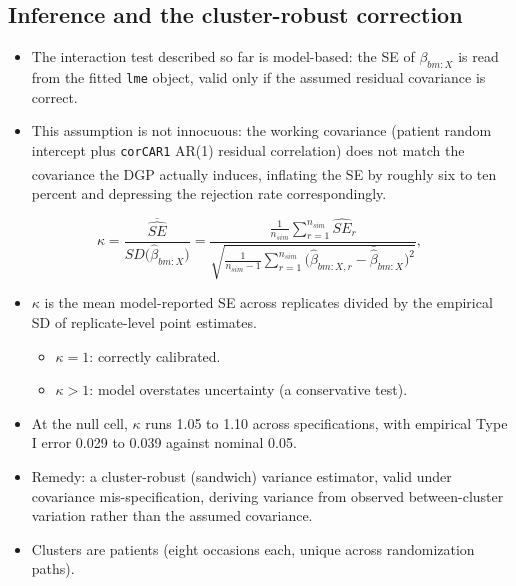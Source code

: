 \documentclass[
  11pt,
]{article}
\providecommand{\tightlist}{%
  \setlength{\itemsep}{0pt}\setlength{\parskip}{0pt}}
\begin{document}
\subsection{Inference and the cluster-robust correction}\label{sec-cr2}

\begin{itemize}
\tightlist
\item
  The interaction test described so far is model-based: the SE of
  \(\beta_{bm:X}\) is read from the fitted \texttt{lme} object, valid only if
  the assumed residual covariance is correct.
\item
  This assumption is not innocuous: the working covariance (patient
  random intercept plus \texttt{corCAR1} AR(1) residual correlation) does
  not match the covariance the DGP actually induces\textsuperscript{}, inflating the SE by roughly six to
  ten percent and depressing the rejection rate correspondingly.
\end{itemize}

\[
\kappa = \frac{\overline{\widehat{SE}}}{SD\big(\hat\beta_{bm:X}\big)}
       = \frac{\frac{1}{n_{sim}}\sum_{r=1}^{n_{sim}} \widehat{SE}_r}
              {\sqrt{\frac{1}{n_{sim}-1}\sum_{r=1}^{n_{sim}}
                \big(\hat\beta_{bm:X,r} - \bar{\hat\beta}_{bm:X}\big)^2}},
\]

\begin{itemize}
\tightlist
\item
  \(\kappa\) is the mean model-reported SE across replicates divided by
  the empirical SD of replicate-level point estimates.

  \begin{itemize}
  \tightlist
  \item
    \(\kappa = 1\): correctly calibrated.
  \item
    \(\kappa > 1\): model overstates uncertainty (a conservative test).
  \end{itemize}
\item
  At the null cell, \(\kappa\) runs 1.05 to 1.10 across specifications,
  with empirical Type I error 0.029 to 0.039 against nominal 0.05.
\item
  Remedy: a cluster-robust (sandwich) variance estimator, valid under
  covariance mis-specification, deriving variance from observed
  between-cluster variation rather than the assumed covariance.
\item
  Clusters are patients (eight occasions each, unique across
  randomization paths).
\end{itemize}
\end{document}

